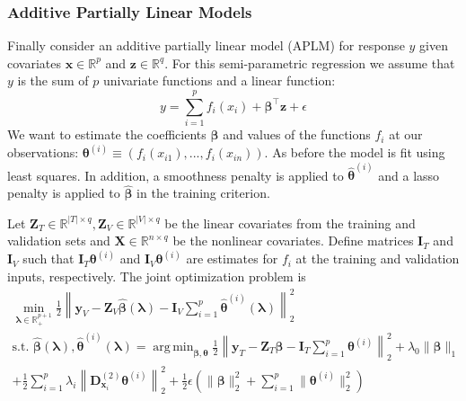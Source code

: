 \documentclass{statsoc}
\DeclareMathOperator*{\argmin}{arg\,min}
\begin{document}
\subsubsection{Additive Partially Linear Models}\label{sec:additive}

Finally consider an additive partially linear model (APLM) for response $y$ given covariates $\boldsymbol{x} \in \mathbb{R}^p$ and $\boldsymbol{z} \in \mathbb{R}^q$. For this semi-parametric regression we assume that $y$ is the sum of $p$ univariate functions and a linear function:
\begin{equation}
y = \sum_{i=1}^p f_i(x_i) + \boldsymbol{\beta}^\top \boldsymbol z  + \epsilon
\end{equation}
We want to estimate the coefficients $\boldsymbol{\beta}$ and values of the functions $f_i$ at our observations: $\boldsymbol{\theta}^{(i)} \equiv (f_i(x_{i1}), ..., f_i(x_{in}))$. As before the model is fit using least squares. In addition, a smoothness penalty is applied to $\hat{\boldsymbol{\theta}}^{(i)}$ and a lasso penalty is applied to $\hat{\boldsymbol{\beta}}$ in the training criterion.

Let $\boldsymbol{Z}_T \in \mathbb{R}^{|T| \times q}, \boldsymbol{Z}_V \in \mathbb{R}^{|V| \times q}$ be the linear covariates from the training and validation sets and $\boldsymbol X \in \mathbb{R}^{n \times q}$ be the nonlinear covariates. Define matrices $\boldsymbol{I}_T$ and $\boldsymbol{I}_V$ such that $\boldsymbol I_T \boldsymbol{\theta}^{(i)}$ and $\boldsymbol I_V \boldsymbol{\theta}^{(i)}$ are estimates for $f_i$ at the training and validation inputs, respectively. The joint optimization problem is
\begin{equation}
\begin{array}{c}
\min_{\boldsymbol\lambda \in \mathbb{R}^{p+1}_{+}} \frac{1}{2}
\left \|
\boldsymbol{y}_V
- \boldsymbol{Z}_V\hat{\boldsymbol{\beta}}(\boldsymbol{\lambda})
- \boldsymbol{I}_V \sum_{i=1}^p \hat{\boldsymbol{\theta}}^{(i)}(\boldsymbol{\lambda})
\right \|^2_2 \\
\text{s.t. }
\hat{\boldsymbol{\beta}}(\boldsymbol{\lambda}),
\hat{\boldsymbol{\theta}}^{(i)}(\boldsymbol{\lambda}) =
\argmin_{\boldsymbol{\beta}, \boldsymbol{\theta}}
\frac{1}{2} \left \|
\boldsymbol{y}_T
- \boldsymbol{Z}_T \boldsymbol{\beta}
- \boldsymbol{I}_T \sum_{i=1}^p \boldsymbol{\theta}^{(i)} \right \|^2_2
+ \lambda_0 \| \boldsymbol{\beta} \|_1 \\
+ \frac{1}{2} \sum_{i=1}^p \lambda_i \left \| \boldsymbol{D}^{(2)}_{\boldsymbol{x}_i} \boldsymbol{\theta}^{(i)} \right \|_2^2
+ \frac{1}{2} \epsilon \left( \| \boldsymbol{\beta} \|_2^2 + \sum_{i=1}^p \| \boldsymbol{\theta}^{(i)} \|_2^2 \right )
\end{array}
\label{aplmProblem}
\end{equation}
\end{document}
